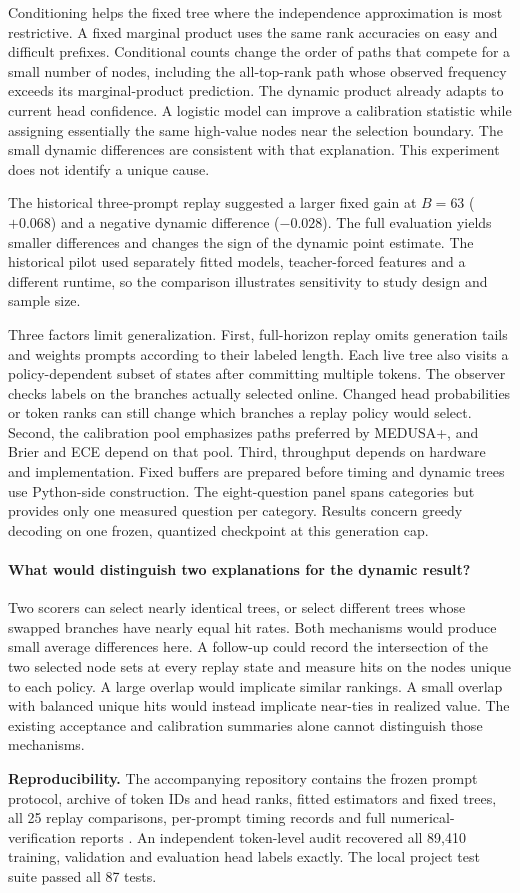 Conditioning helps the fixed tree where the independence approximation is most restrictive. A fixed marginal product uses the same rank accuracies on easy and difficult prefixes. Conditional counts change the order of paths that compete for a small number of nodes, including the all-top-rank path whose observed frequency exceeds its marginal-product prediction. The dynamic product already adapts to current head confidence. A logistic model can improve a calibration statistic while assigning essentially the same high-value nodes near the selection boundary. The small dynamic differences are consistent with that explanation. This experiment does not identify a unique cause.

The historical three-prompt replay suggested a larger fixed gain at $B=63$ ($+0.068$) and a negative dynamic difference ($-0.028$). The full evaluation yields smaller differences and changes the sign of the dynamic point estimate. The historical pilot used separately fitted models, teacher-forced features and a different runtime, so the comparison illustrates sensitivity to study design and sample size.

Three factors limit generalization. First, full-horizon replay omits generation tails and weights prompts according to their labeled length. Each live tree also visits a policy-dependent subset of states after committing multiple tokens. The observer checks labels on the branches actually selected online. Changed head probabilities or token ranks can still change which branches a replay policy would select. Second, the calibration pool emphasizes paths preferred by MEDUSA+, and Brier and ECE depend on that pool. Third, throughput depends on hardware and implementation. Fixed buffers are prepared before timing and dynamic trees use Python-side construction. The eight-question panel spans categories but provides only one measured question per category. Results concern greedy decoding on one frozen, quantized checkpoint at this generation cap.\par
\paragraph{What would distinguish two explanations for the dynamic result?} Two scorers can select nearly identical trees, or select different trees whose swapped branches have nearly equal hit rates. Both mechanisms would produce small average differences here. A follow-up could record the intersection of the two selected node sets at every replay state and measure hits on the nodes unique to each policy. A large overlap would implicate similar rankings. A small overlap with balanced unique hits would instead implicate near-ties in realized value. The existing acceptance and calibration summaries alone cannot distinguish those mechanisms.


\textbf{Reproducibility.} The accompanying repository contains the frozen prompt protocol, archive of token IDs and head ranks, fitted estimators and fixed trees, all 25 replay comparisons, per-prompt timing records and full numerical-verification reports \cite{code}. An independent token-level audit recovered all 89,410 training, validation and evaluation head labels exactly. The local project test suite passed all 87 tests.
